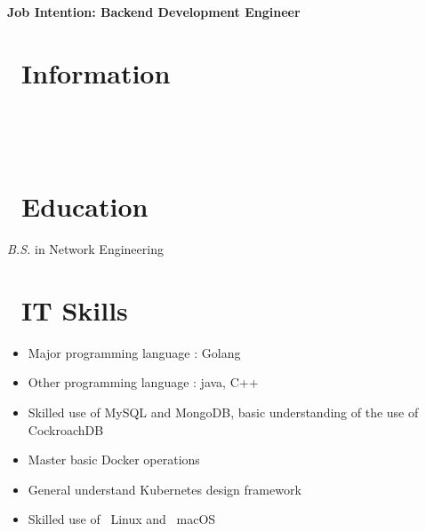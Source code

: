 \documentclass{resume}
\begin{document}

  \hfill \vspace{2mm} \par
\textbf{Job Intention: Backend Development Engineer}

\section{\faUserSecret\ Information} \vspace{1mm}

{\phone\  \qquad\qquad\quad
\email\ 
\vspace{2mm} \par
\github\  \qquad
\faLink\ }

\section{\faGraduationCap\ Education} \vspace{1mm}

\vspace{1mm}
\textit{B.S.} in Network Engineering

\section{\faCogs\ IT Skills} \vspace{1mm}

\begin{itemize}[parsep=1ex]
  \item Major programming language : Golang
  \item Other programming language : java, C++
  \item Skilled use of MySQL and MongoDB, basic understanding of the use of CockroachDB
  \item Master basic Docker operations
  \item General understand Kubernetes design framework
  \item Skilled use of \faLinux\ {Linux} and \faApple\ {macOS}
\end{itemize}
\end{document}
